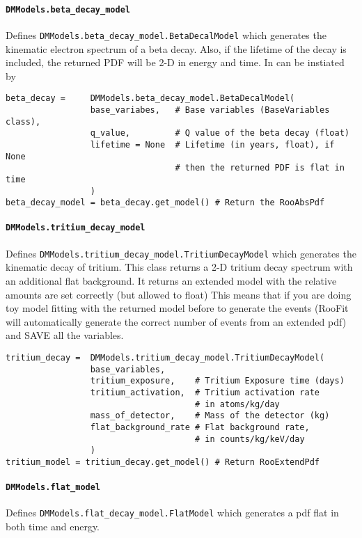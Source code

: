 			\paragraph{\lstinline!DMModels.beta_decay_model!}
Defines \lstinline!DMModels.beta_decay_model.BetaDecalModel! which generates the kinematic
electron spectrum of a beta decay.  Also, if the lifetime of the decay is included, the returned PDF will
be 2-D in energy and time.  In can be instiated by 
				\begin{lstlisting}			
beta_decay =     DMModels.beta_decay_model.BetaDecalModel(
                 base_variabes,   # Base variables (BaseVariables class), 
                 q_value,         # Q value of the beta decay (float)
                 lifetime = None  # Lifetime (in years, float), if None 
                                  # then the returned PDF is flat in time
                 )
beta_decay_model = beta_decay.get_model() # Return the RooAbsPdf
				\end{lstlisting}				

			\paragraph{\lstinline!DMModels.tritium_decay_model!}			
Defines \lstinline!DMModels.tritium_decay_model.TritiumDecayModel! which generates the kinematic decay of
tritium.  This class returns a 2-D tritium decay spectrum with an additional flat background.  
It returns an extended model with the relative amounts are set correctly (but allowed to float)
This means that if you are doing toy model fitting with the returned model before to generate
the events (RooFit will automatically generate the correct number of events from an extended pdf)
and SAVE all the variables. 

				\begin{lstlisting}			
tritium_decay =  DMModels.tritium_decay_model.TritiumDecayModel(
                 base_variables,     
                 tritium_exposure,    # Tritium Exposure time (days) 
                 tritium_activation,  # Tritium activation rate 
                                      # in atoms/kg/day 
                 mass_of_detector,    # Mass of the detector (kg)
                 flat_background_rate # Flat background rate, 
                                      # in counts/kg/keV/day
                 )
tritium_model = tritium_decay.get_model() # Return RooExtendPdf
				\end{lstlisting}				

			\paragraph{\lstinline!DMModels.flat_model!}
Defines \lstinline!DMModels.flat_decay_model.FlatModel! which generates a pdf flat in both time and energy. 

